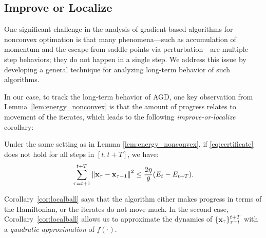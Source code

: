 
\subsection{Improve or Localize} \label{sec:imp_local}
One significant challenge in the analysis of gradient-based algorithms for nonconvex optimation is that many phenomena---such as accumulation of momentum and the escape from saddle points via perturbation---are multiple-step behaviors; they do not happen in a single step. We address this issue by developing a general technique for analyzing long-term behavior of such algorithms.





In our case, to track the long-term behavior of AGD, one key observation from Lemma~\ref{lem:energy_nonconvex} is that the amount of progress relates to movement of the iterates, which leads to the following \emph{improve-or-localize} corollary:
\begin{corollary} \label{cor:localball}
Under the same setting as in Lemma \ref{lem:energy_nonconvex}, if \eqref{eq:certificate} does not hold for all steps in $[t, t+T]$, we have:
\begin{equation*}
\sum_{\tau = t+1}^{t+T}\left\|{\mathbf{x}_\tau - \mathbf{x}_{\tau-1}}\right\|^2
\le \frac{2\eta}{\theta} (E_t - E_{t+T}).
\end{equation*}
\end{corollary}
Corollary~\ref{cor:localball} says that the algorithm either makes progress in terms of the 
Hamiltonian, or the iterates do not move much. In the second case, Corollary~\ref{cor:localball} allows us to approximate the dynamics of $\{\mathbf{x}_\tau\}_{\tau = t}^{t+T}$ with a \emph{quadratic approximation} of $f(\cdot)$.



